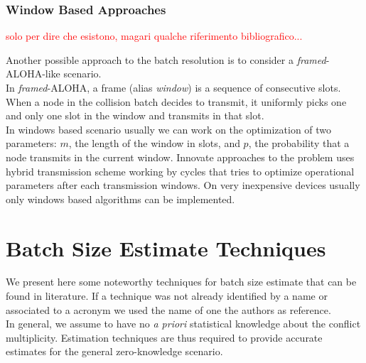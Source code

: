 \documentclass[11pt,a4paper,twoside,openright]{book}
\begin{document}
\subsection{Window Based Approaches}
\textcolor{red}{solo per dire che esistono, magari qualche riferimento bibliografico...\\}

Another possible approach to the batch resolution is to consider a \emph{framed}-ALOHA-like scenario.\\
In \emph{framed}-ALOHA, a frame (alias \emph{window}) is a sequence of consecutive slots.  When a node in the collision batch decides to transmit, it uniformly picks one and only one slot in the window and transmits in that slot.\\
In windows based scenario usually we can work on the optimization of two parameters: $m$, the length of the window in slots, and $p$, the probability that a node transmits in the current window.
Innovate approaches to the problem uses hybrid transmission scheme working by cycles that tries to optimize operational parameters after each transmission windows. On very inexpensive devices usually only windows based algorithms can be implemented.


\chapter{Batch Size Estimate Techniques}
\label{ch:Batch Size Estimate Techniques}
We present here some noteworthy techniques for batch size estimate that can be found in literature.
If a technique was not already identified by a name or associated to a acronym we used the name of one the authors as reference.\\

In general, we assume to have no \emph{a priori} statistical knowledge about the conflict multiplicity. Estimation techniques are thus required to provide accurate estimates for the general zero-knowledge scenario.\\
\end{document}
